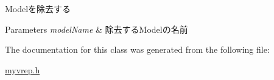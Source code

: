 Modelを除去する 


\begin{DoxyParams}{Parameters}
{\em model\-Name} & 除去する\-Modelの名前 \\
\hline
\end{DoxyParams}


The documentation for this class was generated from the following file\-:\begin{DoxyCompactItemize}
\item 
\hyperlink{myvrep_8h}{myvrep.\-h}\end{DoxyCompactItemize}
